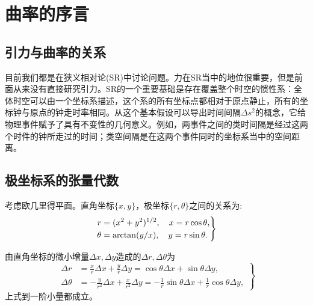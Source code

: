 \chapter{曲率的序言}
\label{chap5}

\section{引力与曲率的关系}
\label{sec5.1}
目前我们都是在狭义相对论(SR)中讨论问题。力在SR当中的地位很重要，但是前面从来没有直接研究引力。SR的一个重要基础是存在覆盖整个时空的惯性系：全体时空可以由一个坐标系描述，这个系的所有坐标点都相对于原点静止，所有的坐标钟与原点的钟走时率相同。从这个基本假设可以导出时间间隔$\Delta s^2$的概念，它给物理事件赋予了具有不变性的几何意义。例如，两事件之间的类时间隔是经过这两个时件的钟所走过的时间；类空间隔是在这两个事件同时的坐标系当中的空间距离。

\section{极坐标系的张量代数}
\label{sec5.2}
考虑欧几里得平面。直角坐标$\{x, y\}$，极坐标$\{r, \theta\}$之间的关系为:
\begin{equation}
    \left.
    \begin{split}
    r &= (x^2 + y^2)^{1/2}, \quad x = r \cos \theta, \\
    \theta &= \operatorname{\mathrm{arctan}} (y / x), \quad y = r \sin \theta.
    \end{split}
    \right\}
\label{equ5.3}
\end{equation}

由直角坐标的微小增量$\Delta x, \Delta y$造成的$\Delta r, \Delta \theta$为
\begin{equation}
\left.
\begin{split}
    \Delta r &= \frac{x}{r} \Delta x + \frac{y}{r} \Delta y = \cos \theta \Delta x + \sin \theta \Delta y, \\
    \Delta \theta &= -\frac{y}{r^2} \Delta x + \frac{x}{r^2} \Delta y = -\frac{1}{r} \sin \theta \Delta x + \frac{1}{r} \cos \theta \Delta y,
\end{split}
\right\}
\label{equ5.4}
\end{equation}
上式到一阶小量都成立。

